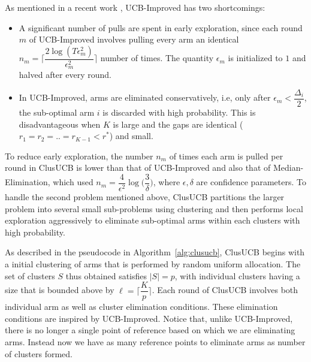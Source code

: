 
As mentioned in a recent work \cite{liu2016modification}, UCB-Improved has two shortcomings: 	\\
\begin{itemize}
\item A significant number of pulls are spent in early exploration, since each round $m$ of UCB-Improved involves pulling every arm an identical $n_{m}=\bigg\lceil \dfrac{ 2\log(T\epsilon^{2}_{m})}{\epsilon^{2}_{m}} \bigg\rceil$ number of times. The quantity $\epsilon_{m}$ is initialized to $1$ and halved after every round.\\
\item In UCB-Improved, arms are eliminated conservatively, i.e, only after $\epsilon_{m}<\dfrac{\Delta_{i}}{2}$, the sub-optimal arm $i$ is discarded with high probability. This is disadvantageous when $K$ is large and the gaps are identical ($r_{1}=r_{2}=..=r_{K-1}<r^{*}$) and small.\\
\end{itemize}

To reduce early exploration, the number $n_m$ of times each arm is pulled per round in ClusUCB is lower than that of UCB-Improved and also that of Median-Elimination, which used $n_m=\dfrac{4}{\epsilon^{2}}\log\big(\dfrac{3}{\delta}\big)$, where $\epsilon,\delta$ are confidence parameters.
To handle the second problem mentioned above, ClusUCB partitions the larger problem into several small sub-problems using clustering and then performs local exploration aggressively to eliminate sub-optimal arms within each clusters with high probability.


As described in the pseudocode in Algorithm~\ref{alg:clusucb}, ClusUCB begins with a initial clustering of arms that is performed by random uniform allocation. The set of clusters $S$ thus obtained satisfies $|S|=p$, with individual clusters having a size that is bounded above by $\ell=\bigg\lceil \dfrac{K}{p} \bigg\rceil$.
Each round of ClusUCB involves both individual arm as well as cluster elimination conditions. These elimination conditions are inspired by UCB-Improved. Notice that, unlike UCB-Improved, there is no longer a single point of reference based on which we are eliminating arms. Instead now we have as many reference points to eliminate arms as number of clusters formed. 

